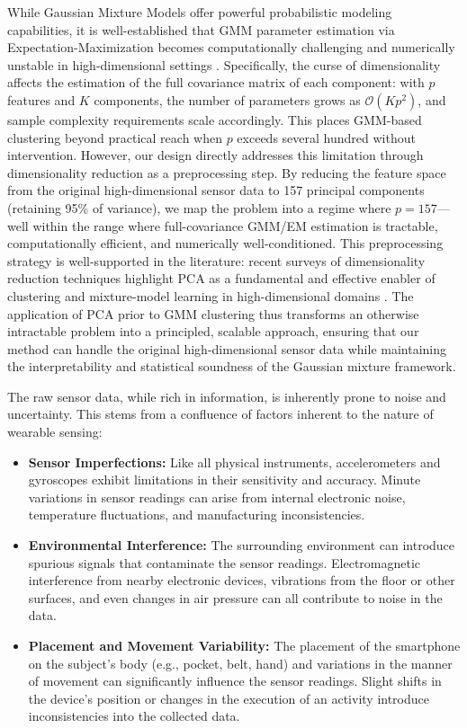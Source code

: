 \documentclass[lettersize,journal]{IEEEtran}
\begin{document}
\noindent While Gaussian Mixture Models offer powerful probabilistic modeling capabilities, it is well-established that GMM parameter estimation via Expectation-Maximization becomes computationally challenging and numerically unstable in high-dimensional settings \cite{jia_feature_2022}. Specifically, the curse of dimensionality affects the estimation of the full covariance matrix of each component: with $p$ features and $K$ components, the number of parameters grows as $\mathcal{O}(K p^2)$, and sample complexity requirements scale accordingly. This places GMM-based clustering beyond practical reach when $p$ exceeds several hundred without intervention. However, our design directly addresses this limitation through dimensionality reduction as a preprocessing step. By reducing the feature space from the original high-dimensional sensor data to 157 principal components (retaining 95\% of variance), we map the problem into a regime where $p = 157$—well within the range where full-covariance GMM/EM estimation is tractable, computationally efficient, and numerically well-conditioned. This preprocessing strategy is well-supported in the literature: recent surveys of dimensionality reduction techniques highlight PCA as a fundamental and effective enabler of clustering and mixture-model learning in high-dimensional domains \cite{berahmand_autoencoders_2024}. The application of PCA prior to GMM clustering thus transforms an otherwise intractable problem into a principled, scalable approach, ensuring that our method can handle the original high-dimensional sensor data while maintaining the interpretability and statistical soundness of the Gaussian mixture framework.

	
	The raw sensor data, while rich in information, is inherently prone to noise and uncertainty. This stems from a confluence of factors inherent to the nature of wearable sensing: 
	
	\begin{itemize}
		\item \textbf{Sensor Imperfections:} Like all physical instruments, accelerometers and gyroscopes exhibit limitations in their sensitivity and accuracy. Minute variations in sensor readings can arise from internal electronic noise, temperature fluctuations, and manufacturing inconsistencies. 
		\item \textbf{Environmental Interference:} The surrounding environment can introduce spurious signals that contaminate the sensor readings. Electromagnetic interference from nearby electronic devices, vibrations from the floor or other surfaces, and even changes in air pressure can all contribute to noise in the data. 
		\item \textbf{Placement and Movement Variability:} The placement of the smartphone on the subject's body (e.g., pocket, belt, hand) and variations in the manner of movement can significantly influence the sensor readings. Slight shifts in the device's position or changes in the execution of an activity introduce inconsistencies into the collected data. 
	\end{itemize}
\end{document}
